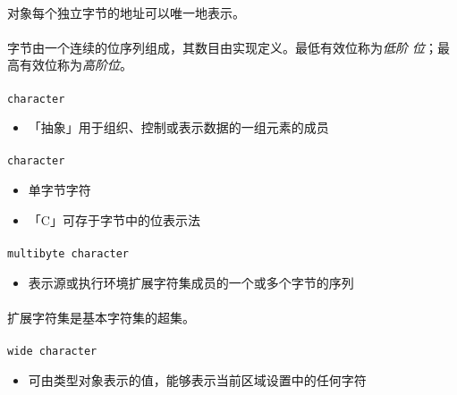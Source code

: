 \paragraph{}
\notes 对象每个独立字节的地址可以唯一地表示。

\paragraph{}
\notes 字节由一个连续的位序列组成，其数目由实现定义。最低有效位称为\textit{低阶
位}；最高有效位称为\textit{高阶位}。

\paragraph{}
\texttt{character}
\begin{itemize}
  \item[]{「抽象」用于组织、控制或表示数据的一组元素的成员}
\end{itemize}

\paragraph{}
\texttt{character}
\begin{itemize}
  \item[]{单字节字符}
  \item[]{「C」可存于字节中的位表示法}
\end{itemize}

\paragraph{}
\texttt{multibyte character}
\begin{itemize}
  \item[]{表示源或执行环境扩展字符集成员的一个或多个字节的序列}
\end{itemize}

\paragraph{}
\notes* 扩展字符集是基本字符集的超集。

\paragraph{}
\texttt{wide character}
\begin{itemize}
  \item[]{可由类型对象表示的值，能够表示当前区域设置中的任何字符}
\end{itemize}

